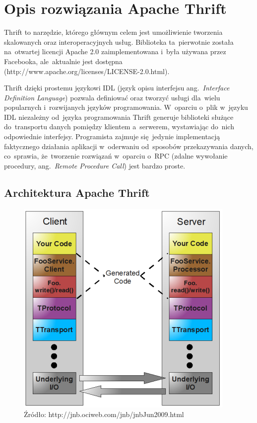 \chapter[Opis rozwiązania Apache Thrift][Opis rozwiązania Apache Thrift]{Opis
rozwiązania Apache Thrift}

Thrift to narzędzie, którego głównym celem jest umożliwienie tworzenia
skalowanych oraz interoperacyjnych usług. Biblioteka ta~pierwotnie została
na~otwartej licencji Apache 2.0
zaimplementowana i~była używana przez Facebooka, ale~aktualnie jest dostępna
(http://www.apache.org/licenses/LICENSE-2.0.html).

\vspace{5mm}
Thrift dzięki prostemu językowi IDL (język opisu interfejsu ang.~\emph{Interface
Definition Language}) pozwala definiować oraz tworzyć usługi dla~wielu
popularnych i~rozwijanych języków programowania. W~oparciu o~plik w~języku IDL
niezależny od~języka programowania Thrift generuje biblioteki służące
do~transportu danych pomiędzy klientem a~serwerem, wystawiając do~nich
odpowiednie interfejsy. Programista zajmuje się~jedynie implementacją
faktycznego działania aplikacji w~oderwaniu od~sposobów przekazywania danych,
co~sprawia, że~tworzenie rozwiązań w~oparciu o~RPC (zdalne wywołanie procedury,
ang.~\emph{Remote Procedure Call}) jest bardzo proste.

\section[Architektura Apache Thrift][Architektura Apache Thrift]{Architektura
Apache Thrift}
\begin{figure}[H]
\center
\flushleft
\includegraphics[keepaspectratio=true]{img/thrift_arch.png}
\caption{Źródło: http://jnb.ociweb.com/jnb/jnbJun2009.html}
\label{fig:thriftArch}
\end{figure}

